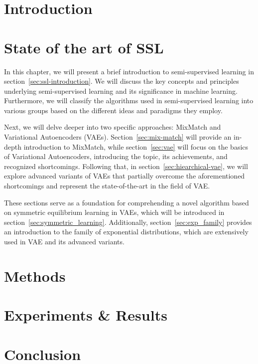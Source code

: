 \documentclass[twoside]{ctuthesis}
\theoremstyle{plain}
\theoremstyle{definition}
\theoremstyle{note}
\begin{document}
\maketitle


\chapter{Introduction}


\chapter{State of the art of SSL}
\label{motivation-theory}
In this chapter, we will present a brief introduction to semi-supervised learning in section~\ref{sec:ssl-introduction}.
We will discuss the key concepts and principles underlying semi-supervised learning and its significance in machine learning. 
Furthermore, we will classify the algorithms used in semi-supervised learning into various groups based on the different ideas 
and paradigms they employ.

Next, we will delve deeper into two specific approaches: MixMatch and Variational Autoencoders (VAEs). Section~\ref{sec:mix-match} 
will provide an in-depth introduction to MixMatch, while section~\ref{sec:vae} will focus on the basics of Variational Autoencoders, 
introducing the topic, its achievements, and recognized shortcomings. Following that, in section~\ref{sec:hiearchical-vae}, we will
explore advanced variants of VAEs that partially overcome the aforementioned shortcomings and represent the state-of-the-art in the field of VAE.

These sections serve as a foundation for comprehending a novel algorithm based on symmetric equilibrium learning in VAEs, 
which will be introduced in section~\ref{sec:symmetric_learning}. Additionally, section~\ref{sec:exp_family} provides an introduction 
to the family of exponential distributions, which are extensively used in VAE and its advanced variants.





\chapter{Methods}
\label{methods}




\chapter{Experiments \& Results} 
\label{results}

\chapter{Conclusion}
\label{conclusions}


\printbibliography


% 
\end{document}

